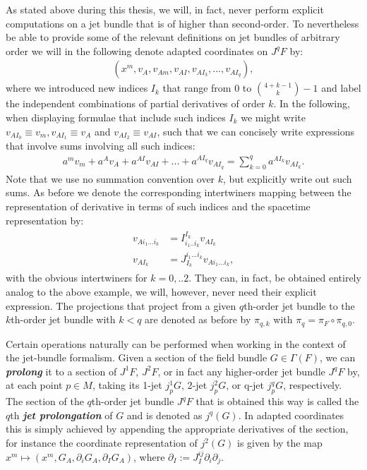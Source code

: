\begin{remark}
As stated above during this thesis, we will, in fact, never perform explicit computations on a jet bundle that is of higher than second-order. To nevertheless be able to provide some of the relevant definitions on jet bundles of arbitrary order we will in the following denote adapted coordinates on $J^qF$ by: 
\begin{align}
(x^m,v_A,v_{Am},v_{AI},v_{AI_{3}},...,v_{AI_{q}}),
\end{align}
where we introduced new indices $I_k$ that range from $0$ to $\binom{4+k-1}{k}-1$ and label the independent combinations of partial derivatives of order $k$. In the following, when displaying formulae that include such indices $I_k$ we might write $v_{AI_0} \equiv v_m, v_{AI_1} \equiv v_A$ and $v_{AI_2} \equiv v_{AI}$, such that we can concisely write expressions that involve sums involving all such indices:
\begin{align}
    a^mv_m + a^Av_A + a^{AI}v_{AI} + ... + a^{AI_q}v_{AI_q} = \sum _{k = 0}^q a^{AI_k}v_{AI_k}.
\end{align}
Note that we use no summation convention over $k$, but explicitly write out such sums.
As before we denote the corresponding intertwiners mapping between the representation of derivative in terms of such indices and the spacetime representation by:
\begin{align}
    \begin{aligned}
    v_{Ai_1...i_k} &= I^{I_k}_{i_1..i_k} v_{AI_k}\\
    v_{AI_k} &= J_{I_k}^{i_1...i_k} v_{Ai_1...i_k},
    \end{aligned}
\end{align}
with the obvious intertwiners for $k=0,..2$.
They can, in fact, be obtained entirely analog to the above example, we will, however, never need their explicit expression. 
The projections that project from a given $q$th-order jet bundle to the $k$th-order jet bundle with $k< q$ are denoted as before by $\pi_{q,k}$ with $\pi_q = \pi_F \circ \pi_{q,0}$.
\end{remark}

Certain operations naturally can be performed when working in the context of the jet-bundle formalism.
Given a section of the field bundle $G \in \Gamma(F)$, we can \textit{\textbf{prolong}} it to a section of $J^1F$, $J^2F$, or in fact any higher-order jet bundle $J^qF$ by, at each point $p \in M$, taking its 1-jet $j^1_pG$, 2-jet $j^2_pG$, or q-jet $j^q_pG$, respectively. The section of the $q$th-order jet bundle $J^qF$ that is obtained this way is called the $q$th \textbf{\textit{jet prolongation}} of $G$ and is denoted as $j^q(G)$. In adapted coordinates this is simply achieved by appending the appropriate derivatives of the section, for instance the coordinate representation of $j^2(G)$ is given by the map $x^m \mapsto (x^m, G_A, \partial_i G_A, \partial_I G_A)$, where $\partial_I := J_I^{ij} \partial_i \partial_j$.

